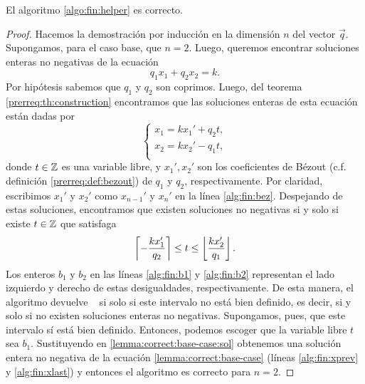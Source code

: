 \begin{theorem}
	\label{th:fin:helper:correct}
	El algoritmo \ref{algo:fin:helper} es correcto.
\end{theorem}
\begin{proof}
	Hacemos la demostración por inducción en la dimensión $n$ del vector $\vec{q}$. Supongamos, para
	el caso base, que $n = 2$. Luego, queremos encontrar soluciones enteras no negativas de la
	ecuación
	\begin{equation}
		\label{lemma:correct:base-case}
		q_1x_1 + q_2x_2 = k.
	\end{equation}
	Por hipótesis sabemos que $q_1$ y $q_2$ son coprimos. Luego, del teorema
	\ref{prerreq:th:construction} encontramos que las soluciones enteras de esta ecuación están
	dadas por
	\begin{equation}
		\label{lemma:correct:base-case:sol}
		\begin{cases}
			x_1 = kx_1' + q_2t, \\
			x_2 = kx_2' - q_1t, \\
		\end{cases}
	\end{equation}
	donde $t \in \mathbb{Z}$ es una variable libre, y $x_1', x_2'$ son los coeficientes de Bézout (c.f.
	definición \ref{prerreq:def:bezout}) de $q_1$ y $q_2$, respectivamente. Por claridad, escribimos
	$x_1'$ y $x_2'$ como $x_{n-1}'$ y $x_{n}'$ en la línea \ref{alg:fin:bez}. Despejando de estas
	soluciones, encontramos que existen soluciones no negativas si y solo si existe $t \in \mathbb{Z}$ que
	satisfaga
	\begin{equation*}
		\left\lceil -\frac{kx_1'}{q_2} \right\rceil \leq t \leq \left\lfloor \frac{kx_2'}{q_1} \right\rfloor.
	\end{equation*}
	Los enteros $b_1$ y $b_2$ en las líneas \ref{alg:fin:b1} y \ref{alg:fin:b2} representan el
	lado izquierdo y derecho de estas desigualdades, respectivamente. De esta manera, el algoritmo
	devuelve \NIL~ si solo si este intervalo no está bien definido, es decir, si y solo si no existen
	soluciones enteras no negativas. Supongamos, pues, que este intervalo sí está bien definido.
	Entonces, podemos escoger que la variable libre $t$ sea $b_1$. Sustituyendo en
	\eqref{lemma:correct:base-case:sol} obtenemos una solución entera no negativa de la ecuación
	\eqref{lemma:correct:base-case} (líneas \ref{alg:fin:xprev} y \ref{alg:fin:xlast}) y entonces
	el algoritmo es correcto para $n = 2$.


\end{proof}
